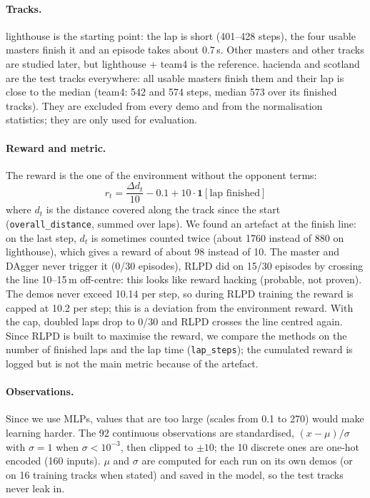\documentclass[10pt,a4paper]{article}
\begin{document}
\paragraph{Tracks.}
lighthouse is the starting point: the lap is short (401--428 steps), the four usable masters finish it and an episode takes about 0.7\,s.
Other masters and other tracks are studied later, but lighthouse + team4 is the reference.
hacienda and scotland are the test tracks everywhere: all usable masters finish them and their lap is close to the median (team4: 542 and 574 steps, median 573 over its finished tracks).
They are excluded from every demo and from the normalisation statistics; they are only used for evaluation.

\paragraph{Reward and metric.}
The reward is the one of the environment without the opponent terms:
\[
  r_t = \frac{\Delta d_t}{10} - 0.1 + 10\cdot\mathbf{1}[\text{lap finished}]
\]
where $d_t$ is the distance covered along the track since the start (\texttt{overall\_distance}, summed over laps).
We found an artefact at the finish line: on the last step, $d_t$ is sometimes counted twice (about 1760 instead of 880 on lighthouse), which gives a reward of about 98 instead of 10.
The master and DAgger never trigger it (0/30 episodes), RLPD did on 15/30 episodes by crossing the line 10--15\,m off-centre: this looks like reward hacking (probable, not proven).
The demos never exceed 10.14 per step, so during RLPD training the reward is capped at 10.2 per step; this is a deviation from the environment reward.
With the cap, doubled laps drop to 0/30 and RLPD crosses the line centred again.
Since RLPD is built to maximise the reward, we compare the methods on the number of finished laps and the lap time (\texttt{lap\_steps}); the cumulated reward is logged but is not the main metric because of the artefact.

\paragraph{Observations.}
Since we use MLPs, values that are too large (scales from 0.1 to 270) would make learning harder.
The 92 continuous observations are standardised, $(x-\mu)/\sigma$ with $\sigma{=}1$ when $\sigma{<}10^{-3}$, then clipped to $\pm10$; the 10 discrete ones are one-hot encoded (160 inputs).
$\mu$ and $\sigma$ are computed for each run on its own demos (or on 16 training tracks when stated) and saved in the model, so the test tracks never leak in.
\end{document}
